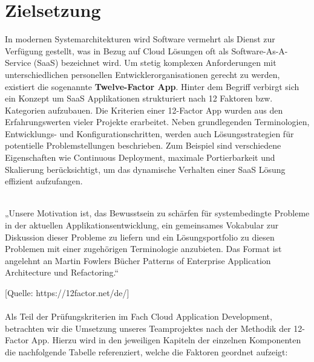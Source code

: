\section{Zielsetzung}
In modernen Systemarchitekturen wird Software vermehrt als Dienst zur Verfügung gestellt, was in Bezug auf Cloud Lösungen oft als Software-As-A-Service (SaaS) bezeichnet wird.  Um stetig komplexen Anforderungen mit unterschiedlichen personellen Entwicklerorganisationen  gerecht zu werden, existiert die sogenannte \textbf{Twelve-Factor App}. Hinter dem Begriff verbirgt sich ein Konzept um SaaS Applikationen strukturiert nach 12 Faktoren bzw. Kategorien aufzubauen. Die Kriterien einer 12-Factor App wurden aus den Erfahrungswerten vieler Projekte erarbeitet. Neben grundlegenden Terminologien, Entwicklungs- und Konfigurationschritten, werden auch Lösungsstrategien für potentielle Problemstellungen beschrieben. Zum Beispiel sind verschiedene Eigenschaften wie Continuous Deployment, maximale Portierbarkeit und Skalierung berücksichtigt, um das dynamische Verhalten einer SaaS Lösung effizient aufzufangen.\\ \\


\begin{itshape}
„Unsere Motivation ist, das Bewusstsein zu schärfen für systembedingte Probleme in der aktuellen Applikationsentwicklung, ein gemeinsames Vokabular zur Diskussion dieser Probleme zu liefern und ein Lösungsportfolio zu diesen Problemen mit einer zugehörigen Terminologie anzubieten. Das Format ist angelehnt an Martin Fowlers Bücher Patterns of Enterprise Application Architecture und Refactoring.“ 
\end{itshape} 
[Quelle: https://12factor.net/de/] \\ \\

Als Teil der Prüfungskriterien im Fach Cloud Application Development, betrachten wir die Umsetzung unseres Teamprojektes nach der Methodik der 12-Factor App. Hierzu wird in den jeweiligen Kapiteln der einzelnen Komponenten die nachfolgende Tabelle referenziert, welche die Faktoren geordnet aufzeigt: